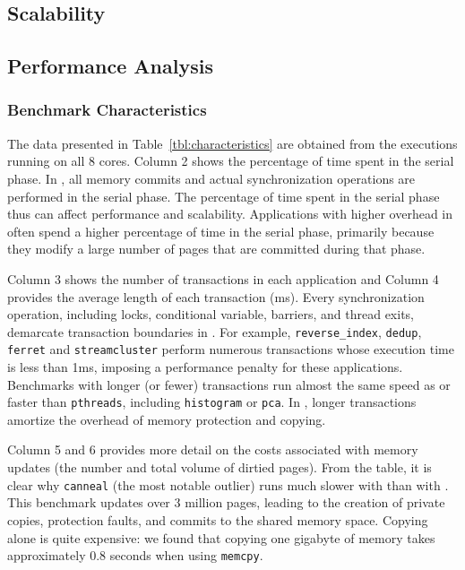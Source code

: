 \subsection{Scalability}



\subsection{Performance Analysis}

\subsubsection{Benchmark Characteristics}

The data presented in Table~\ref{tbl:characteristics} are obtained from the executions running on all 8 cores.  Column 2 shows the percentage of time spent in the serial phase.  In \dthreads{}, all memory commits and actual synchronization operations are performed in the serial phase.  The percentage of time spent in the serial phase thus can affect performance and scalability. Applications with higher overhead in \dthreads{} often spend a higher percentage of time in the
serial phase, primarily because they modify a large number of pages that are committed during that phase.

Column 3 shows the number of transactions in each application and Column 4 provides the average length of each transaction (ms).  Every synchronization operation, including locks, conditional variable, barriers, and thread exits, demarcate transaction boundaries in \dthreads{}.  For example, \texttt{reverse\_index}, \texttt{dedup}, \texttt{ferret}
and \texttt{streamcluster} perform numerous transactions whose
execution time is less than 1ms, imposing a performance penalty for these applications.  Benchmarks with longer (or fewer) transactions run almost the same speed as or faster than \texttt{pthreads}, including \texttt{histogram} or \texttt{pca}.  In \dthreads{}, longer transactions amortize the overhead of memory protection and copying.

Column 5 and 6 provides more detail on the costs associated with memory updates (the number and total volume of dirtied pages). From the table, it is clear why \texttt{canneal} (the most notable outlier) runs much slower with \dthreads{} than with \pthreads{}. This benchmark updates over 3 million pages, leading to the creation of private copies, protection faults, and commits to the shared memory space. Copying alone is quite expensive: we found that copying one gigabyte of memory takes approximately 0.8 seconds when using \texttt{memcpy}.

